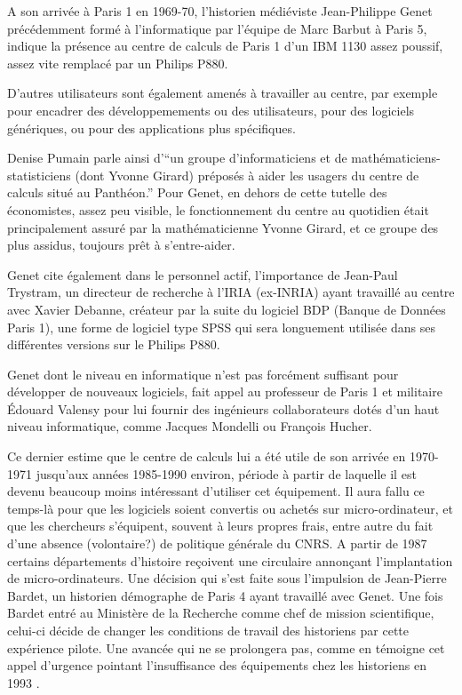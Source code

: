A son arrivée à Paris 1 en 1969-70, l'historien médiéviste Jean-Philippe Genet précédemment formé à l'informatique par l'équipe de Marc Barbut à Paris 5, indique la présence au centre de calculs de Paris 1 d'un IBM 1130 assez poussif, assez vite remplacé par un Philips P880.

D'autres utilisateurs sont également amenés à travailler au centre, par exemple pour encadrer des développemements ou des utilisateurs, pour des logiciels génériques, ou pour des applications plus spécifiques.

Denise Pumain parle ainsi d'\enquote{un groupe d'informaticiens et de mathématiciens-statisticiens (dont Yvonne Girard) préposés à aider les usagers du centre de calculs situé au Panthéon.} Pour Genet, en dehors de cette tutelle des économistes, assez peu visible, le fonctionnement du centre au quotidien était principalement assuré par la mathématicienne Yvonne Girard, et ce groupe des plus assidus, toujours prêt à s'entre-aider.

Genet cite également dans le personnel actif, l'importance de Jean-Paul Trystram, un directeur de recherche à l'IRIA (ex-INRIA) ayant travaillé au centre avec Xavier Debanne, créateur par la suite du logiciel BDP (Banque de Données Paris 1), une forme de logiciel type SPSS qui sera longuement utilisée dans ses différentes versions sur le Philips P880.

Genet dont le niveau en informatique n'est pas forcément suffisant pour développer de nouveaux logiciels, fait appel au professeur de Paris 1 et militaire Édouard Valensy pour lui fournir des ingénieurs collaborateurs dotés d'un haut niveau informatique, comme Jacques Mondelli ou François Hucher. 

Ce dernier estime que le centre de calculs lui a été utile de son arrivée en 1970-1971 jusqu'aux années 1985-1990 environ, période à partir de laquelle il est devenu beaucoup moins intéressant d'utiliser cet équipement. Il aura fallu ce temps-là pour que les logiciels soient convertis ou achetés sur micro-ordinateur, et que les chercheurs s'équipent, souvent à leurs propres frais, entre autre du fait d'une absence (volontaire?) de politique générale du CNRS. A partir de 1987 certains départements d'histoire reçoivent une circulaire annonçant l'implantation de micro-ordinateurs. Une décision qui s'est faite sous l'impulsion de Jean-Pierre Bardet, un historien démographe de Paris 4 ayant travaillé avec Genet. Une fois Bardet entré au Ministère de la Recherche comme chef de mission scientifique, celui-ci décide de changer les conditions de travail des historiens par cette expérience pilote. Une avancée qui ne se prolongera pas, comme en témoigne cet appel d'urgence pointant l'insuffisance des équipements chez les historiens en 1993 \autocite{Genet1993}. %


